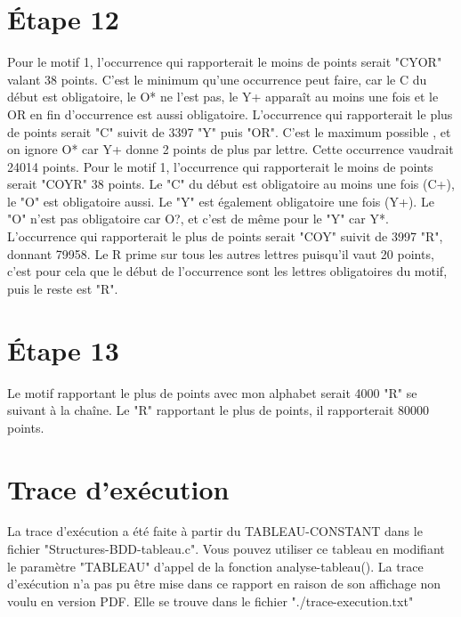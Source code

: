 \documentclass{article}
\begin{document}
\section*{Étape 12}
Pour le motif 1, l'occurrence qui rapporterait le moins de points serait "CYOR" valant 38 points. C'est le minimum qu'une occurrence peut faire, car le C du début est obligatoire, le O* ne l'est pas, le Y+ apparaît au moins une fois et le OR en fin d'occurrence est aussi obligatoire. L'occurrence qui rapporterait le plus de points serait "C" suivit de 3397 "Y" puis "OR". C'est le maximum possible , et on ignore O* car Y+ donne 2 points de plus par lettre. Cette occurrence vaudrait 24014 points.\newline\newline
Pour le motif 1, l'occurrence qui rapporterait le moins de points serait "COYR" 38 points. Le "C" du début est obligatoire au moins une fois (C+), le "O" est obligatoire aussi. Le "Y" est également obligatoire une fois (Y+). Le "O" n'est pas obligatoire car O?, et c'est de même pour le "Y" car Y*. L'occurrence qui rapporterait le plus de points serait "COY" suivit de 3997 "R", donnant 79958. Le R prime sur tous les autres lettres puisqu'il vaut 20 points, c'est pour cela que le début de l'occurrence sont les lettres obligatoires du motif, puis le reste est "R".

\section*{Étape 13}
Le motif rapportant le plus de points avec mon alphabet serait 4000 "R" se suivant à la chaîne. Le "R" rapportant le plus de points, il rapporterait 80000 points.

\section*{Trace d'exécution}
La trace d'exécution a été faite à partir du TABLEAU-CONSTANT dans le fichier "Structures-BDD-tableau.c". Vous pouvez utiliser ce tableau en modifiant le paramètre "TABLEAU" d'appel de la fonction analyse-tableau(). La trace d'exécution n'a pas pu être mise dans ce rapport en raison de son affichage non voulu en version PDF. Elle se trouve dans le fichier "./trace-execution.txt"\newline\newline
\end{document}
